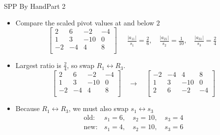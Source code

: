 \documentclass[10pt]{beamer}
\begin{document}
\begin{frame}{SPP By Hand}{Part 2}
    
\begin{itemize}
    \item Compare the scaled pivot values at and below $\boxed{2}$
    \[
    \left[\begin{array}{rrr|r}
    \boxed{2} & 6 & -2 & -4 \\
    1 & 3 & -10 & 0 \\
    -2 & -4 & 4 & 8 \\
    \end{array}\right]\quad \begin{aligned}
    \frac{|a_{11}|}{s_1} = \frac{2}{6}, \quad
    \frac{|a_{21}|}{s_2} = \frac{1}{10}, \quad
    \frac{|a_{31}|}{s_3} = \frac{2}{4}
    \end{aligned}
    \]
    
    \item Largest ratio is \( \frac{2}{4} \), so swap \( R_1 \leftrightarrow R_3 \).
    \[
    \left[\begin{array}{rrr|r}
    \boxed{2} & 6 & -2 & -4 \\
    1 & 3 & -10 & 0 \\
    -2 & -4 & 4 & 8 \\
    \end{array}\right]\quad  \rightarrow \quad  \left[\begin{array}{rrr|r}
    \boxed{-2} & -4 & 4 & 8 \\
    1 & 3 & -10 & 0 \\
    2 & 6 & -2 & -4 \\
    \end{array}\right]
    \]
    \item Because $R_1 \leftrightarrow R_3$, we must also swap $s_1 \leftrightarrow s_3$
        \begin{align*}
            \mathrm{old:} & s_1 = 6, \quad s_2 = 10, \quad s_3 = 4\\
            \mathrm{new:} & s_1 = 4, \quad s_2 = 10, \quad s_3 = 6\\
        \end{align*}
\end{itemize}
\end{frame}
\end{document}
